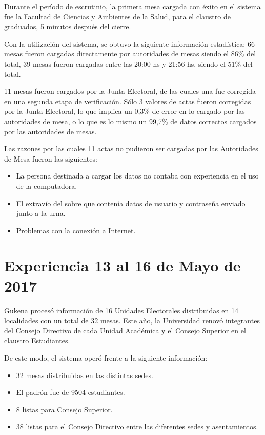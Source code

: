 Durante el período de escrutinio, la primera mesa cargada con éxito en el sistema fue la Facultad de Ciencias y Ambientes de la Salud, para el claustro de graduados, 5 minutos después del cierre.

Con la utilización del sistema, se obtuvo la siguiente información estadística:
66 mesas fueron cargadas directamente por autoridades de mesas siendo el 86\% del total, 39 mesas fueron cargadas entre las 20:00 hs y 21:56 hs, siendo el 51\% del total.

11 mesas fueron cargados por la Junta Electoral, de las cuales una fue corregida en una segunda etapa de verificación.
Sólo 3 valores de actas fueron corregidas por la Junta Electoral, lo que implica un 0,3\% de error en lo cargado por las autoridades de mesa, o lo que es lo mismo un 99,7\% de datos correctos cargados por las autoridades de mesas.

Las razones por las cuales 11 actas no pudieron ser cargadas por las Autoridades de Mesa fueron las siguientes:
\begin{itemize}
\item La persona destinada a cargar los datos no contaba con experiencia en el uso de la computadora.
\item El extravío del sobre que contenía datos de usuario y contraseña enviado junto a la urna.
\item Problemas con la conexión a Internet.
\end{itemize}

\section{Experiencia 13 al 16 de Mayo de 2017}
Gukena procesó información de 16 Unidades Electorales distribuidas en 14 localidades con un total de 32 mesas. Este año, la Universidad renovó integrantes del Consejo Directivo de cada Unidad Académica y el Consejo Superior en el claustro Estudiantes.

De este modo, el sistema operó frente a la siguiente información:
\begin{itemize}
    \item 32 mesas distribuidas en las distintas sedes.
    \item El padrón fue de 9504 estudiantes.
    \item 8 listas para Consejo Superior.
    \item 38 listas para el Consejo Directivo entre las diferentes sedes y asentamientos.
\end{itemize}
  
